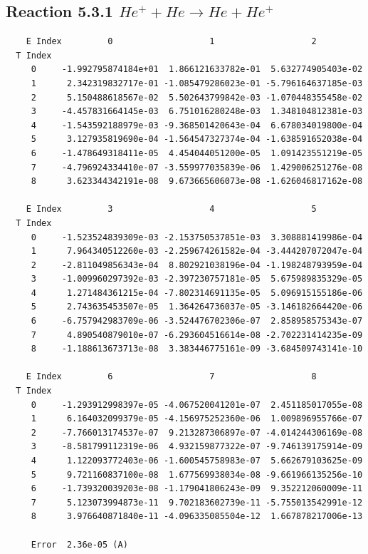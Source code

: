 \documentclass[12pt,dvipdfmx]{article}
\begin{document}
\newpage
\subsection{
Reaction 5.3.1 $   He^+ + He \rightarrow He + He^+$}


\begin{small}\begin{verbatim}
    E Index         0                   1                   2
  T Index
     0     -1.992795874184e+01  1.866121633782e-01  5.632774905403e-02
     1      2.342319832717e-01 -1.085479286023e-01 -5.796164637185e-03
     2      5.150488618567e-02  5.502643799842e-03 -1.070448355458e-02
     3     -4.457831664145e-03  6.751016280248e-03  1.348104812381e-03
     4     -1.543592188979e-03 -9.368501420643e-04  6.678034019800e-04
     5      3.127935819690e-04 -1.564547327374e-04 -1.638591652038e-04
     6     -1.478649318411e-05  4.454044051200e-05  1.091423551219e-05
     7     -4.796924334410e-07 -3.559977035839e-06  1.429006251276e-08
     8      3.623344342191e-08  9.673665606073e-08 -1.626046817162e-08

    E Index         3                   4                   5
  T Index
     0     -1.523524839309e-03 -2.153750537851e-03  3.308881419986e-04
     1      7.964340512260e-03 -2.259674261582e-04 -3.444207072047e-04
     2     -2.811049856343e-04  8.802921038196e-04 -1.198248793959e-04
     3     -1.009960297392e-03 -2.397230757181e-05  5.675989835329e-05
     4      1.271484361215e-04 -7.802314691135e-05  5.096915155186e-06
     5      2.743635453507e-05  1.364264736037e-05 -3.146182664420e-06
     6     -6.757942983709e-06 -3.524476702306e-07  2.858958575343e-07
     7      4.890540879010e-07 -6.293604516614e-08 -2.702231414235e-09
     8     -1.188613673713e-08  3.383446775161e-09 -3.684509743141e-10

    E Index         6                   7                   8
  T Index
     0     -1.293912998397e-05 -4.067520041201e-07  2.451185017055e-08
     1      6.164032099379e-05 -4.156975252360e-06  1.009896955766e-07
     2     -7.766013174537e-07  9.213287306897e-07 -4.014244306169e-08
     3     -8.581799112319e-06  4.932159877322e-07 -9.746139175914e-09
     4      1.122093772403e-06 -1.600545758983e-07  5.662679103625e-09
     5      9.721160837100e-08  1.677569938034e-08 -9.661966135256e-10
     6     -1.739320039203e-08 -1.179041806243e-09  9.352212060009e-11
     7      5.123073994873e-11  9.702183602739e-11 -5.755013542991e-12
     8      3.976640871840e-11 -4.096335085504e-12  1.667878217006e-13

     Error  2.36e-05 (A)
\end{verbatim}\end{small}
\end{document}

